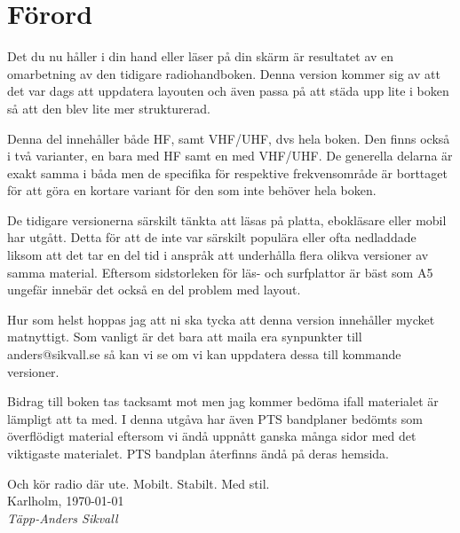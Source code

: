 \section*{Förord}

Det du nu håller i din hand eller läser på din skärm är resultatet av
en omarbetning av den tidigare radiohandboken. Denna version kommer
sig av att det var dags att uppdatera layouten och även passa på att
städa upp lite i boken så att den blev lite mer strukturerad.

Denna del innehåller både HF, samt VHF/UHF, dvs hela boken. Den finns
också i två varianter, en bara med HF samt en med VHF/UHF. De
generella delarna är exakt samma i båda men de specifika för
respektive frekvensområde är borttaget för att göra en kortare variant
för den som inte behöver hela boken.

De tidigare versionerna särskilt tänkta att läsas på platta,
ebokläsare eller mobil har utgått. Detta för att de inte var särskilt
populära eller ofta nedladdade liksom att det tar en del tid i anspråk
att underhålla flera olikva versioner av samma material. Eftersom
sidstorleken för läs- och surfplattor är bäst som A5 ungefär innebär
det också en del problem med layout.

Hur som helst hoppas jag att ni ska tycka att denna version innehåller
mycket matnyttigt. Som vanligt är det bara att maila era synpunkter
till anders@sikvall.se så kan vi se om vi kan uppdatera dessa till
kommande versioner.

Bidrag till boken tas tacksamt mot men jag kommer bedöma ifall
materialet är lämpligt att ta med. I denna utgåva har även PTS
bandplaner bedömts som överflödigt material eftersom vi ändå uppnått
ganska många sidor med det viktigaste materialet. PTS bandplan
återfinns ändå på deras hemsida.

Och kör radio där ute. Mobilt. Stabilt. Med stil.\\[4em]

Karlholm, \today\\
\textit{Täpp-Anders Sikvall}

\clearpage
